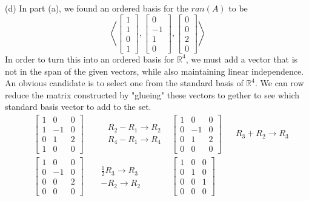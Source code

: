 \documentclass{report}
\begin{document}
\\
\\
\noindent (d) In part (a), we found an ordered basis for the $ran(A)$ to be
$$
\left\langle 
\begin{bmatrix} 1 \\ 1 \\ 0 \\ 1 \end{bmatrix},
\begin{bmatrix} 0 \\ -1 \\ 1 \\ 0 \end{bmatrix},
\begin{bmatrix} 0 \\ 0 \\ 2 \\ 0 \end{bmatrix}
\right\rangle
$$
In order to turn this into an ordered basis for $\mathbb{R}^4$, we must add a vector that is not in the span of the given vectors, while also maintaining linear independence. An obvious candidate is to select one from the standard basis of $\mathbb{R}^4$. We can row reduce the matrix constructed by "glueing" these vectors to gether to see which standard basis vector to add to the set.
\begin{align*}
	& \begin{bmatrix}
	1 & 0 & 0 \\
	1 & -1 & 0 \\
	0 & 1 & 2 \\	
	1 & 0 & 0
	\end{bmatrix}
	&& \begin{aligned} & R_2 - R_1 \rightarrow R_2 \\ & R_4 - R_1 \rightarrow R_4 \end{aligned}
	& \begin{bmatrix}
	1 & 0 & 0 \\
	0 & -1 & 0 \\
	0 & 1 & 2 \\
	0 & 0 & 0 
	\end{bmatrix}
	&& R_3 + R_2 \rightarrow R_3 \\
	& \begin{bmatrix}
	1 & 0 & 0 \\
	0 & -1 & 0 \\
	0 & 0 & 2 \\
	0 & 0 & 0
	\end{bmatrix}
	&& \begin{aligned} \frac{1}{2}R_3 \rightarrow R_3 \\ -R_2 \rightarrow R_2 \end{aligned}
	& \begin{bmatrix}
	1 & 0 & 0 \\
	0 & 1 & 0 \\
	0 & 0 & 1 \\
	0 & 0 & 0
	\end{bmatrix}
\end{align*}
\end{document}
